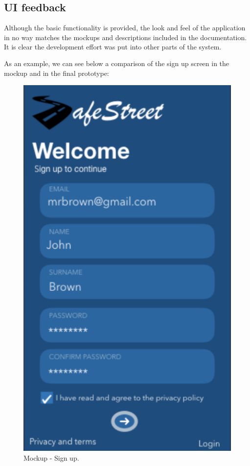 \subsection{UI feedback}
Although the basic functionality is provided, the look and feel of the application in no way matches the mockups and descriptions included in the documentation. It is clear the development effort was put into other parts of the system.

As an example, we can see below a comparison of the sign up screen in the mockup and in the final prototype:
\begin{figure}[H]
    \centering
    \begin{minipage}{.4\textwidth}
        \centering
        \includegraphics[width=.8\textwidth]{Images/mockup-sign-up.png}
        \caption{\label{fig:mockup-sign-up}Mockup - Sign up.}
    \end{minipage}

\end{figure}

